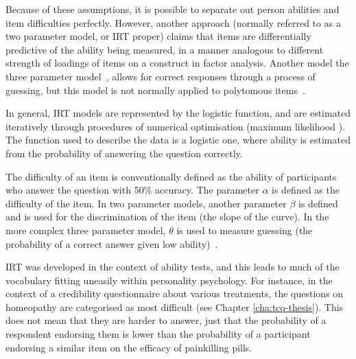 Because of these assumptions, it is possible to separate out person abilities and item difficulties perfectly. However, another approach (normally referred to as a two parameter model, or IRT proper) claims that items are differentially predictive of the ability being measured, in a manner analogous to different strength of loadings of items on a construct in factor analysis. Another model the three parameter model~\cite{lord1968statistical}, allows for correct responses through a process of guessing, but this model is not normally applied to polytomous items~\cite{van1997handbook,Mair2010}.


In general, IRT models are represented by the logistic function, and are estimated iteratively through procedures of numerical optimisation (maximum likelihood \cite{fischer1995rasch}). The function used to describe the data is a logistic one, where ability is estimated from the probability of answering the question correctly. %

The difficulty of an item is conventionally defined as the ability of participants who answer the question with 50\% accuracy. The parameter $\alpha$ is defined as the difficulty of the item. In two parameter models, another parameter $\beta$ is defined and is used for the discrimination of the item (the slope of the curve). In the more complex three parameter model, $\theta$ is used to measure guessing (the probability of a correct answer given low ability)~\cite{van1997handbook}.

IRT was developed in the context of ability tests, and this leads to much of the vocabulary fitting uneasily within personality psychology. For instance, in the context of a credibility questionnaire about various treatments, the questions on homeopathy are categorised as most difficult (see Chapter \ref{cha:tcq-thesis}). This does not mean that they are harder to answer, just that the probability of a respondent endorsing them is lower than the probability of a participant endorsing a similar item on the efficacy of painkilling pills.

